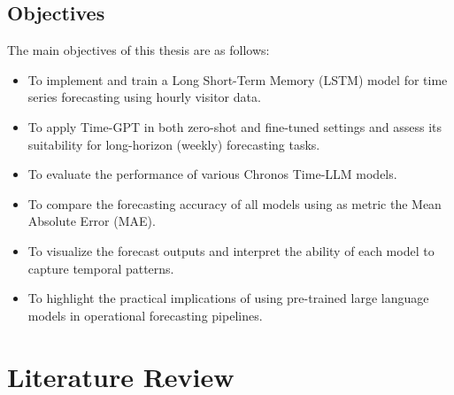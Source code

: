 \documentclass{article}
\begin{document}
\subsection{Objectives}
The main objectives of this thesis are as follows:

\begin{itemize}
    \item To implement and train a Long Short-Term Memory (LSTM) model for time series forecasting using hourly visitor data.
\end{itemize}

\begin{itemize}
    \item To apply Time-GPT in both zero-shot and fine-tuned settings and assess its suitability for long-horizon (weekly) forecasting tasks.
\end{itemize}

\begin{itemize}
    \item To evaluate the performance of various Chronos Time-LLM models.
\end{itemize}

\begin{itemize}
    \item To compare the forecasting accuracy of all models using as metric the Mean Absolute Error (MAE).
\end{itemize}

\begin{itemize}
    \item To visualize the forecast outputs and interpret the ability of each model to capture temporal patterns.
\end{itemize}

\begin{itemize}
    \item To highlight the practical implications of using pre-trained large language models in operational forecasting pipelines.
\end{itemize}


\newpage
\section{Literature Review}
\end{document}
